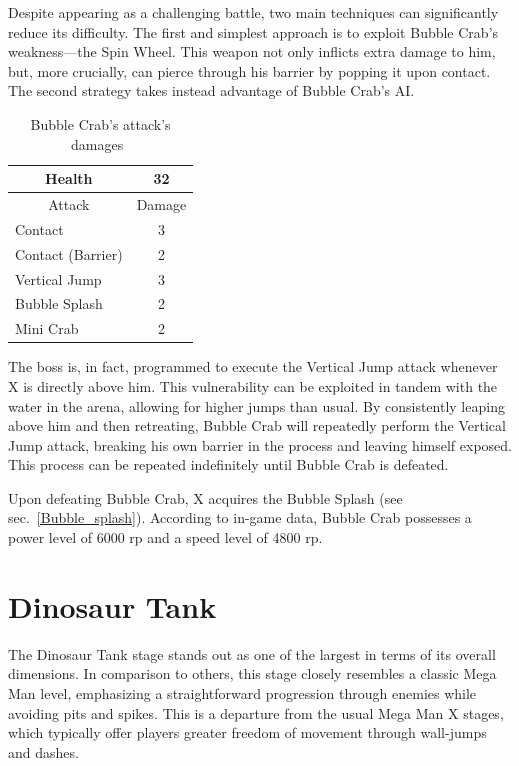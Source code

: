 Despite appearing as a challenging battle, two main techniques can significantly reduce its difficulty. The first and simplest approach is to exploit Bubble Crab's weakness—the Spin Wheel. This weapon not only inflicts extra damage to him, but, more crucially, can pierce through his barrier by popping it upon contact. The second strategy takes instead advantage of Bubble Crab's AI.\begin{table}[htp]
	\centering
	\begin{tabular}[h]{l c}
		\toprule
		\multicolumn{1}{c}{Health}  & 32 \\
		\midrule
		\multicolumn{1}{c}{Attack} & \multicolumn{1}{c}{Damage}\\
		Contact & 3 \\
		Contact (Barrier) & 2\\
		Vertical Jump& 3\\
		Bubble Splash & 2\\
		Mini Crab & 2\\
		\bottomrule
	\end{tabular}
	\caption{Bubble Crab's attack's damages~\cite{wiki:Bubble_Crab,book:Compendium}}
\end{table} The boss is, in fact, programmed to execute the Vertical Jump attack whenever X is directly above him. This vulnerability can be exploited in tandem with the water in the arena, allowing for higher jumps than usual. By consistently leaping above him and then retreating, Bubble Crab will repeatedly perform the Vertical Jump attack, breaking his own barrier in the process and leaving himself exposed. This process can be repeated indefinitely until Bubble Crab is defeated.


Upon defeating Bubble Crab, X acquires the Bubble Splash (see sec.~\ref{Bubble_splash}). According to in-game data, Bubble Crab possesses a power level of 6000 rp and a speed level of 4800 rp.

\section{Dinosaur Tank}
The Dinosaur Tank stage stands out as one of the largest in terms of its overall dimensions. In comparison to others, this stage closely resembles a classic Mega Man level, emphasizing a straightforward progression through enemies while avoiding pits and spikes. This is a departure from the usual Mega Man X stages, which typically offer players greater freedom of movement through wall-jumps and dashes. 

